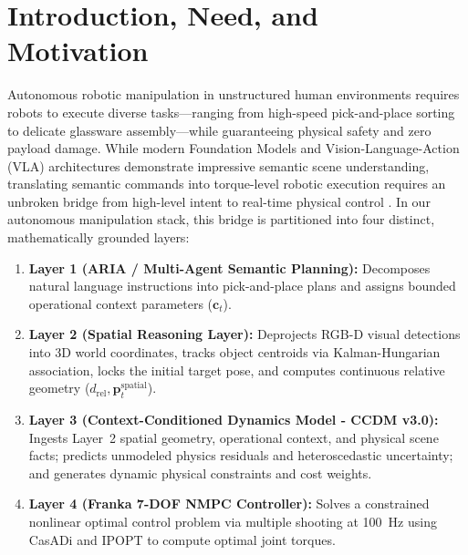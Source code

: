 \documentclass[10pt,a4paper]{article}
\begin{document}
\section{Introduction, Need, and Motivation}
Autonomous robotic manipulation in unstructured human environments requires robots to execute diverse tasks---ranging from high-speed pick-and-place sorting to delicate glassware assembly---while guaranteeing physical safety and zero payload damage. While modern Foundation Models and Vision-Language-Action (VLA) architectures \cite{ahn2022saycan, liang2023code, brohan2023rt1} demonstrate impressive semantic scene understanding, translating semantic commands into torque-level robotic execution requires an unbroken bridge from high-level intent to real-time physical control \cite{lynch2017modern, craig2005introduction}. In our autonomous manipulation stack, this bridge is partitioned into four distinct, mathematically grounded layers:
\begin{enumerate}
    \item \textbf{Layer 1 (ARIA / Multi-Agent Semantic Planning):} Decomposes natural language instructions into pick-and-place plans and assigns bounded operational context parameters ($\mathbf{c}_t$).
    \item \textbf{Layer 2 (Spatial Reasoning Layer):} Deprojects RGB-D visual detections into 3D world coordinates, tracks object centroids via Kalman-Hungarian association, locks the initial target pose, and computes continuous relative geometry ($d_{\mathrm{rel}}, \mathbf{p}_t^{\mathrm{spatial}}$).
    \item \textbf{Layer 3 (Context-Conditioned Dynamics Model - CCDM v3.0):} Ingests Layer~2 spatial geometry, operational context, and physical scene facts; predicts unmodeled physics residuals and heteroscedastic uncertainty; and generates dynamic physical constraints and cost weights.
    \item \textbf{Layer 4 (Franka 7-DOF NMPC Controller):} Solves a constrained nonlinear optimal control problem via multiple shooting at 100~Hz using CasADi and IPOPT \cite{andersson2019casadi, wachter2006implementation} to compute optimal joint torques.
\end{enumerate}
\end{document}
